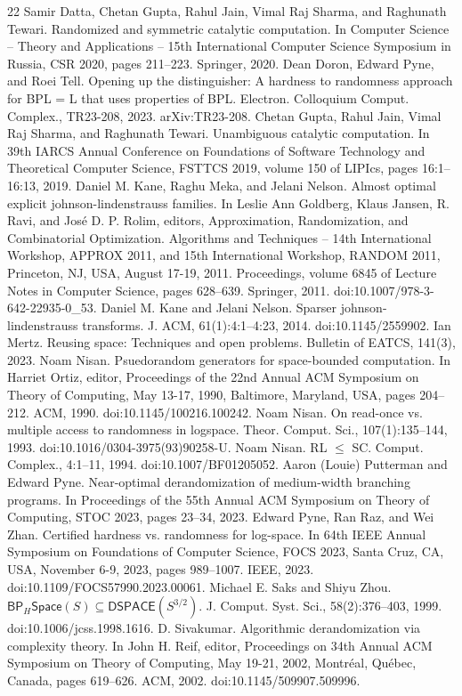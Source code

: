 \documentclass[10pt,a4paper]{article}
\begin{document}
\begin{thebibliography}{22}
 Samir Datta, Chetan Gupta, Rahul Jain, Vimal Raj Sharma, and Raghunath Tewari. Randomized and symmetric catalytic computation. In Computer Science – Theory and Applications – 15th International Computer Science Symposium in Russia, CSR 2020, pages 211–223. Springer, 2020.
 Dean Doron, Edward Pyne, and Roei Tell. Opening up the distinguisher: A hardness to randomness approach for BPL = L that uses properties of BPL. Electron. Colloquium Comput. Complex., TR23-208, 2023. arXiv:TR23-208.
 Chetan Gupta, Rahul Jain, Vimal Raj Sharma, and Raghunath Tewari. Unambiguous catalytic computation. In 39th IARCS Annual Conference on Foundations of Software Technology and Theoretical Computer Science, FSTTCS 2019, volume 150 of LIPIcs, pages 16:1–16:13, 2019.
 Daniel M. Kane, Raghu Meka, and Jelani Nelson. Almost optimal explicit johnson-lindenstrauss families. In Leslie Ann Goldberg, Klaus Jansen, R. Ravi, and José D. P. Rolim, editors, Approximation, Randomization, and Combinatorial Optimization. Algorithms and Techniques – 14th International Workshop, APPROX 2011, and 15th International Workshop, RANDOM 2011, Princeton, NJ, USA, August 17-19, 2011. Proceedings, volume 6845 of Lecture Notes in Computer Science, pages 628–639. Springer, 2011. doi:10.1007/978-3-642-22935-0\_53.
 Daniel M. Kane and Jelani Nelson. Sparser johnson-lindenstrauss transforms. J. ACM, 61(1):4:1–4:23, 2014. doi:10.1145/2559902.
 Ian Mertz. Reusing space: Techniques and open problems. Bulletin of EATCS, 141(3), 2023.
 Noam Nisan. Psuedorandom generators for space-bounded computation. In Harriet Ortiz, editor, Proceedings of the 22nd Annual ACM Symposium on Theory of Computing, May 13-17, 1990, Baltimore, Maryland, USA, pages 204–212. ACM, 1990. doi:10.1145/100216.100242.
 Noam Nisan. On read-once vs. multiple access to randomness in logspace. Theor. Comput. Sci., 107(1):135–144, 1993. doi:10.1016/0304-3975(93)90258-U.
 Noam Nisan. RL $\leq$ SC. Comput. Complex., 4:1–11, 1994. doi:10.1007/BF01205052.
 Aaron (Louie) Putterman and Edward Pyne. Near-optimal derandomization of medium-width branching programs. In Proceedings of the 55th Annual ACM Symposium on Theory of Computing, STOC 2023, pages 23–34, 2023.
 Edward Pyne, Ran Raz, and Wei Zhan. Certified hardness vs. randomness for log-space. In 64th IEEE Annual Symposium on Foundations of Computer Science, FOCS 2023, Santa Cruz, CA, USA, November 6-9, 2023, pages 989–1007. IEEE, 2023. doi:10.1109/FOCS57990.2023.00061.
 Michael E. Saks and Shiyu Zhou. $\mathsf{BP}_H\mathsf{Space}(S)\subseteq\mathsf{DSPACE}(S^{3/2})$. J. Comput. Syst. Sci., 58(2):376–403, 1999. doi:10.1006/jcss.1998.1616.
 D. Sivakumar. Algorithmic derandomization via complexity theory. In John H. Reif, editor, Proceedings on 34th Annual ACM Symposium on Theory of Computing, May 19-21, 2002, Montréal, Québec, Canada, pages 619–626. ACM, 2002. doi:10.1145/509907.509996.
\end{thebibliography}
\end{document}
